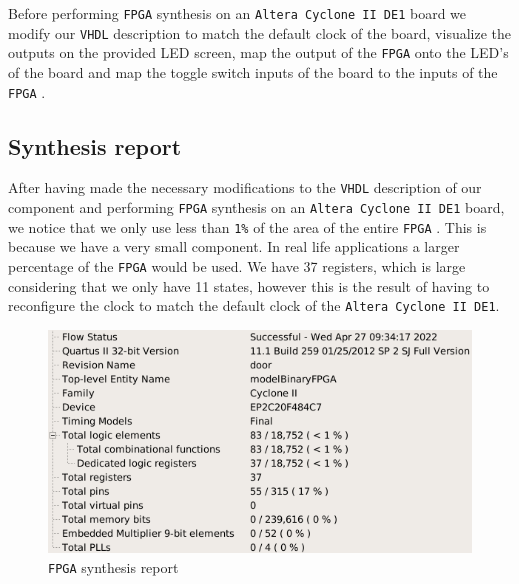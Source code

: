 \documentclass[a4paper,11pt]{article}
\begin{document}
	\par Before performing \texttt{FPGA} synthesis on an \texttt{Altera Cyclone II DE1} board we modify our \texttt{VHDL} description to match the default clock of the board, visualize the outputs on the provided LED screen, map the output of the \texttt{FPGA} onto the LED's of the board and map the toggle switch inputs of the board to the inputs of the \texttt{FPGA} .
	
	\subsection{Synthesis report}
	\par After having made the necessary modifications to the \texttt{VHDL} description of our component and performing \texttt{FPGA} synthesis on an \texttt{Altera Cyclone II DE1} board, we notice that we only use less than \texttt{1\%} of the area of the entire \texttt{FPGA} . This is because we have a very small component. In real life applications a larger percentage of the \texttt{FPGA} would be used. We have 37 registers, which is large considering that we only have 11 states, however this is the result of having to reconfigure the clock to match the default clock of the \texttt{Altera Cyclone II DE1}. 
	\begin{figure}[H]
	    \centering
	    \includegraphics[width=0.5\linewidth]{PROJECT2.png}
	    \caption{\texttt{FPGA} synthesis report}
	\end{figure}
	
\end{document}

